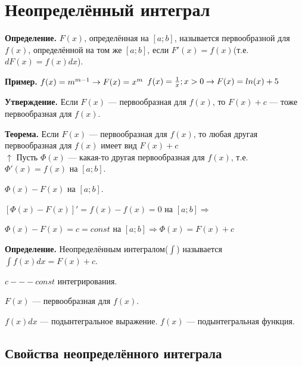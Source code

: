\documentclass{article}
\begin{document}
    \section{Неопределённый интеграл}

    \textbf{Определение.} \(F(x)\), определённая на \([a;b]\), называется первообразной для \(f(x)\), определённой на том же \([a;b]\), если \(F'(x) = f(x)\)(т.е. \(dF(x)=f(x)dx\)).

    \textbf{Пример.}
    \(\\f(x) = m^{m-1} \rightarrow F(x) = x^m \\\)
    \(f(x) = \frac{1}{x}; x > 0 \rightarrow F(x) = ln(x) + 5 \\\)

    \textbf{Утверждение.} Если \(F(x)\) --- первообразная для \(f(x)\), то \(F(x)+c\) --- тоже первообразная для \(f(x)\).

    \textbf{Теорема.} Если \(F(x)\) --- первообразная для \(f(x)\), то любая другая первообразная для \(f(x)\) имеет вид \(F(x) + c\)\\

    \(\uparrow\) Пусть \(\Phi(x)\) --- какая-то другая первообразная для \(f(x)\), т.е. \(\Phi'(x) = f(x)\) на \([a;b]\).

    \( \Phi(x) - F(x)\) на \([a;b]\).
    
    \([\Phi(x) - F(x)]' = f(x) - f(x) = 0\) на \([a;b] \Rightarrow\) 
    
    \(\Phi(x) - F(x) = c = const\) на \([a;b] \Rightarrow \Phi(x) = F(x) + c \)
    
    \textbf{Определение.} Неопределённым интегралом(\(\int\)) называется \(\int f(x)dx = F(x) + c\).
    
    \(c --- const\) интегрирования.

    \(F(x)\) --- первообразная для \(f(x)\).

    \(f(x)dx\) --- подынтегральное выражение.
    \(f(x)\) --- подынтегральная функция.

    \subsection{Свойства неопределённого интеграла}
\end{document}
